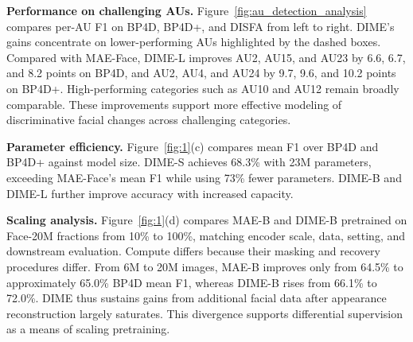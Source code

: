 \documentclass[10pt,journal,compsoc]{IEEEtran}
\begin{document}
\noindent\textbf{Performance on challenging AUs.}
Figure~\ref{fig:au_detection_analysis} compares per-AU F1 on BP4D, BP4D+, and DISFA from left to right. DIME's gains concentrate on lower-performing AUs highlighted by the dashed boxes. Compared with MAE-Face, DIME-L improves AU2, AU15, and AU23 by 6.6, 6.7, and 8.2 points on BP4D, and AU2, AU4, and AU24 by 9.7, 9.6, and 10.2 points on BP4D+. High-performing categories such as AU10 and AU12 remain broadly comparable. These improvements support more effective modeling of discriminative facial changes across challenging categories.


\noindent\textbf{Parameter efficiency.}
Figure~\ref{fig:1}(c) compares mean F1 over BP4D and BP4D+ against model size. DIME-S achieves 68.3\% with 23M parameters, exceeding MAE-Face's mean F1 while using 73\% fewer parameters. DIME-B and DIME-L further improve accuracy with increased capacity.

\noindent\textbf{Scaling analysis.}
Figure~\ref{fig:1}(d) compares MAE-B and DIME-B pretrained on Face-20M fractions from 10\% to 100\%, matching encoder scale, data, setting, and downstream evaluation. Compute differs because their masking and recovery procedures differ. From 6M to 20M images, MAE-B improves only from 64.5\% to approximately 65.0\% BP4D mean F1, whereas DIME-B rises from 66.1\% to 72.0\%. DIME thus sustains gains from additional facial data after appearance reconstruction largely saturates. This divergence supports differential supervision as a means of scaling pretraining.
\end{document}
